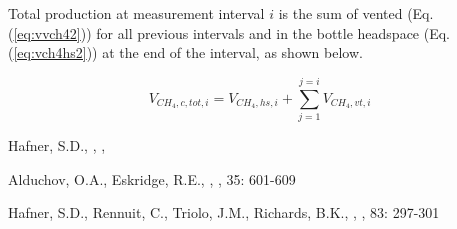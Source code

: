 \documentclass[]{article}
\begin{document}
Total  production at measurement interval $i$ is the sum of vented  (Eq. (\ref{eq:vvch42})) for all previous intervals and  in the bottle headspace (Eq. (\ref{eq:vch4hs2})) at the end of the interval, as shown below.

\begin{equation}
  \label{eq:vch4tot2}
  V_{CH_4,c,tot,i} = V_{CH_4,hs,i} + \sum_{j = 1}^{j = i} {V_{CH_4,vt,i}}
\end{equation}

\begin{thebibliography}{1}

Hafner, S.D.,
    ,
    ,

Alduchov, O.A., Eskridge, R.E.,   
    ,
    , 
     35: 601-609

Hafner, S.D., Rennuit, C., Triolo, J.M., Richards, B.K.,
    ,
    ,
         83: 297-301

\end{thebibliography}
\end{document}
